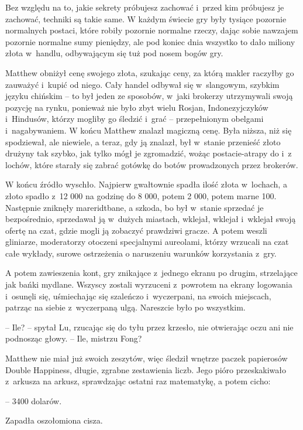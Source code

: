 \documentclass[oneside,polish,11pt,rmheadings]{mwbk}
\begin{document}
Bez względu na to, jakie sekrety próbujesz zachować i~przed kim próbujesz je zachować, techniki są takie same. W każdym świecie gry były tysiące pozornie normalnych postaci, które robiły pozornie normalne rzeczy, dając sobie nawzajem pozornie normalne sumy pieniędzy, ale pod koniec dnia wszystko to dało miliony złota w~handlu, odbywającym się tuż pod nosem bogów gry. 


Matthew obniżył cenę swojego złota, szukając ceny, za którą makler raczyłby go zauważyć i~kupić od niego. Cały handel odbywał się w~slangowym, szybkim języku chińskim -- to był jeden ze sposobów, w~jaki brokerzy utrzymywali swoją pozycję na rynku, ponieważ nie było zbyt wielu Rosjan, Indonezyjczyków i~Hindusów, którzy mogliby go śledzić i~grać -- przepełnionym obelgami i~nagabywaniem. W końcu Matthew znalazł magiczną cenę. Była niższa, niż się spodziewał, ale niewiele, a teraz, gdy ją znalazł, był w~stanie przenieść złoto drużyny tak szybko, jak tylko mógł je zgromadzić, wożąc postacie-atrapy do i~z lochów, które starały się zabrać gotówkę do botów prowadzonych przez brokerów. 


W końcu źródło wyschło. Najpierw gwałtownie spadła ilość złota w~lochach, a złoto spadło z~12 000 na godzinę do 8 000, potem 2 000, potem marne 100. Następnie zniknęły mareridtbane, a szkoda, bo był w~stanie sprzedać je bezpośrednio, sprzedawał ją w~dużych miastach, wklejał, wklejał i~wklejał swoją ofertę na czat, gdzie mogli ją zobaczyć prawdziwi gracze. A potem weszli gliniarze, moderatorzy otoczeni specjalnymi aureolami, którzy wrzucali na czat całe wykłady, surowe ostrzeżenia o naruszeniu warunków korzystania z~gry. 


A potem zawieszenia kont, gry znikające z~jednego ekranu po drugim, strzelające jak bańki mydlane. Wszyscy zostali wyrzuceni z~powrotem na ekrany logowania i~osunęli się, uśmiechając się szaleńczo i~wyczerpani, na swoich miejscach, patrząc na siebie z~wyczerpaną ulgą. Nareszcie było po wszystkim.  


-- Ile? -- spytał Lu, rzucając się do tyłu przez krzesło, nie otwierając oczu ani nie podnosząc głowy. -- Ile, mistrzu Fong? 


Matthew nie miał już swoich zeszytów, więc śledził wnętrze paczek papierosów Double Happiness, długie, zgrabne zestawienia liczb. Jego pióro przeskakiwało z~arkusza na arkusz, sprawdzając ostatni raz matematykę, a potem cicho:

 -- 3400 dolarów. 


Zapadła oszołomiona cisza. 
\end{document}
